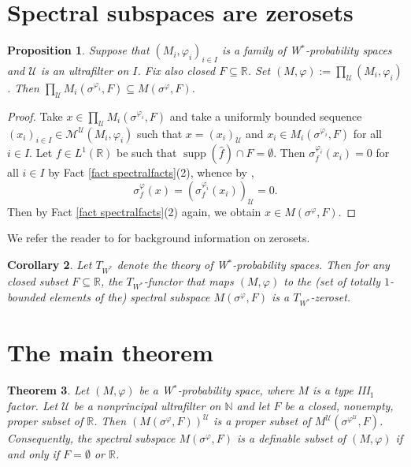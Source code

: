 \documentclass[12pt]{amsart}
\newtheorem{thm}{Theorem}[section]
\newtheorem{prop}[thm]{Proposition}
\newtheorem{cor}[thm]{Corollary}
\theoremstyle{definition}
\def\bb{\mathbb}
\def\bb{\mathbb}
\def\cal{\mathcal}
\def\u{\mathsf 1}
\def\M{\mathcal{M}}
\newcommand\cU{{\cal U}}
\def \u{\mathcal U}
\begin{document}
\section{Spectral subspaces are zerosets}

\begin{prop}\label{containment}
Suppose that $(M_i,\varphi_i)_{i\in I}$ is a family of W$^*$-probability spaces and $\u$ is an ultrafilter on $I$.  Fix also closed $F\subseteq \bb R$.  Set $(M,\varphi):=\prod_\u (M_i,\varphi_i)$.  Then $\prod_\u M_i(\sigma^{\varphi_i},F)\subseteq M(\sigma^\varphi,F)$.
\end{prop}

\begin{proof}
Take $x \in \prod_\cU M_i(\sigma^{\varphi_i}, F)$ and take a uniformly bounded sequence $(x_i)_{i \in I}\in \M^{\cU}(M_i,\varphi_i)$ such that $x=(x_i)_\u$ and $x_i \in M_i(\sigma^{\varphi_i}, F)$ for all $i\in I$. 
Let $f\in L^1(\mathbb{R})$ be such that $\operatorname{supp}(\hat{f})\cap F=\emptyset$. 
Then $\sigma_f^{\varphi_i}(x_i)=0$ for all $i\in I$ by Fact \ref{fact spectralfacts}(2), whence by \cite[Lemma 4.14]{AH14}, 
\[\sigma_f^{\varphi}(x)=(\sigma_f^{\varphi_i}(x_i))_{\cU}=0.\]
Then by Fact \ref{fact spectralfacts}(2) again, we obtain $x\in M(\sigma^\varphi,F)$.
\end{proof}

We refer the reader to \cite[Appendix B]{AG2026_bicentralizer} for background information on zerosets.

\begin{cor}
Let $T_{W^*}$ denote the theory of W$^*$-probability spaces.  Then for any closed subset $F\subseteq \bb R$, the $T_{W^*}$-functor that maps $(M,\varphi)$ to the (set of totally $1$-bounded elements of the) spectral subspace $M(\sigma^\varphi,F)$ is a $T_{W^*}$-zeroset. 
\end{cor}

\section{The main theorem}

\begin{thm}\label{prop Arvesonisundefinable}
    Let $(M,\varphi)$ be a W$^*$-probability space, where $M$ is a type III$_1$ factor. Let $\u$ be a nonprincipal ultrafilter on $\mathbb{N}$ and let $F$ be a closed, nonempty, proper subset of $\mathbb{R}$. Then $(M(\sigma^{\varphi},F))^{\cU}$ is a \emph{proper} subset of $M^{\cU}(\sigma^{\varphi^{\cU}},F)$. Consequently, the spectral subspace $M(\sigma^{\varphi},F)$ is a definable subset of $(M,\varphi)$ if and only if $F=\emptyset$ or $\bb R$. 
\end{thm}
\end{document}
